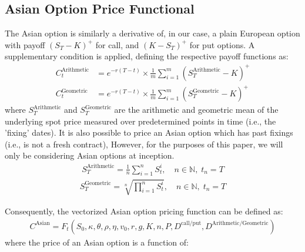 \documentclass[11pt]{article}
\begin{document}
	\subsection{Asian Option Price Functional}
		\vfill
		The Asian option is similarly a derivative of, in our case, a plain European option with payoff $(S_T-K)^{+}$ for call, and $(K-S_T)^{+}$ for put options. A supplementary condition is applied, defining the respective payoff functions as:
		\begin{align}
			C^{\text{Arithmetic}}_t &= e^{-r(T-t)} \times \frac{1}{m} \sum_{i=1}^{m} (S_{T}^{\text{Arithmetic}} - K)^{+} \\
			C^{\text{Geometric}}_t &= e^{-r(T-t)} \times \frac{1}{m} \sum_{i=1}^{m} (S_{T}^{\text{Geometric}} - K)^{+}
		\end{align} \label{eq:AsianPayoffs}
		where $S_{T}^{\text{Arithmetic}}$ and $S_{T}^{\text{Geometric}}$ are the arithmetic and geometric mean of the underlying spot price measured over predetermined points in time (i.e., the 'fixing' dates). It is also possible to price an Asian option which has past fixings (i.e., is not a fresh contract), However, for the purposes of this paper, we will only be considering Asian options at inception.
		\begin{align}
			S^{\text{Arithmetic}}_T = \frac{1}{n} \sum_{i=1}^{n} S^{i}_{t}, \hspace{1em} n \in \mathbb{N}, \; t_n = T
		\end{align} \label{eq:arithmeticavg}
		\begin{align}
			S^{\text{Geometric}}_T =  \sqrt[n]{\prod_{i=1}^{n} S^{i}_{t}}, \hspace{1em} n \in \mathbb{N}, \; t_n = T
		\end{align} \label{eq:geometricavg}
		\par
		Consequently, the vectorized Asian option pricing function can be defined as:
		\begin{align}
			C^{\text{Asian}} = F_{t}(S_0, \kappa, \theta, \rho, \eta, v_{0}, r, g, K, n, P, D^{\text{call/put}}, D^{\text{Arithmetic/Geometric}}) \label{eq:Casian}
		\end{align}
		where the price of an Asian option is a function of:
\end{document}
